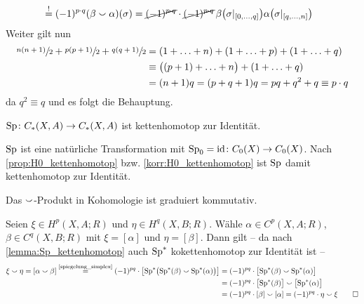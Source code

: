 \begin{beweis}
\begin{enumerate}[a)]
\begin{align}
			&\stackrel{!}{=} (-1)^{p \cdot q} \enbrace*{\beta \cupp \alpha}(\sigma) = \cancel{(-1)^{p \cdot q}} \cdot \cancel{(-1)^{p \cdot q}} \,\beta \enbrace*{\sigma|_{\benbrace{0, \ldots ,q}}} 
			\alpha \enbrace*{\sigma|_{\benbrace*{q, \ldots ,n}}}
		\end{align}
		Weiter gilt nun
		\begin{align}
			\sfrac{n(n+1)}{2} + \sfrac{p(p+1)}{2} + \sfrac{q(q+1)}{2} &= (1+ \ldots + n) + (1+ \ldots + p) + (1+ \ldots + q)\\ 
			&\equiv \enbrace[\big]{(p+1) + \ldots + n} + (1+ \ldots + q)\\
			&= (n+1) q = (p+q+1) q = pq + q^2 + q \equiv p \cdot q
		\end{align}
		da $q^2 \equiv q$ und es folgt die Behauptung.\qedhere
	\end{enumerate}
\end{beweis}

\begin{lemma}[{name=[Spiegelung ist kettenhomotop zur Identität]},label=lemma:Sp_kettenhomotop]
	$\Sp \colon C_*(X,A) \to C_*(X,A)$ ist kettenhomotop zur Identität. 
\end{lemma}
\begin{beweis}
	$\Sp$ ist eine natürliche Transformation mit $\Sp_0 =\id \colon C_0(X) \to C_0(X)$.
	Nach \autoref{prop:H0_kettenhomotop} bzw. \autoref{korr:H0_kettenhomotop} ist $\Sp$ damit kettenhomotop zur Identität.
\end{beweis}

\begin{satz}[{name=[Das $\cupp$-Produkt in Kohomologie ist graduiert kommutativ]},label=satz:cup_grad_komm]
	Das $\cupp$-Produkt in Kohomologie ist graduiert kommutativ. 
\end{satz}
\begin{beweis}
	Seien $\xi \in H^p(X,A;R)$ und $\eta \in H^q(X,B;R)$. 
	Wähle $\alpha \in C^p(X,A;R)$, $\beta \in C^q(X,B;R)$ mit $\xi= [\alpha]$ und $\eta= [\beta]$. 
	Dann gilt -- da nach \autoref{lemma:Sp_kettenhomotop} auch $\Sp^*$ kokettenhomotop zur Identität ist --
	\begin{align}
		\xi \cupp \eta = \benbrace*{\alpha \cupp \beta} \StackText{\ref{spiegelung_simplex}}{=} (-1)^{pq} \cdot \benbrace*{\Sp^* \enbrace[\big]{\Sp^*(\beta) \cupp \Sp^*(\alpha)}} &= (-1)^{pq} \cdot 
		\benbrace[\big]{\Sp^*(\beta) \cupp \Sp^*(\alpha)} \\
		&= (-1)^{pq} \cdot \benbrace[\big]{\Sp^*(\beta)} \cupp \benbrace[\big]{\Sp^*(\alpha)}\\ 
		&= (-1)^{pq} \cdot [\beta] \cupp [\alpha] = (-1)^{pq} \cdot \eta \cupp \xi \qedhere
	\end{align}
\end{beweis}

